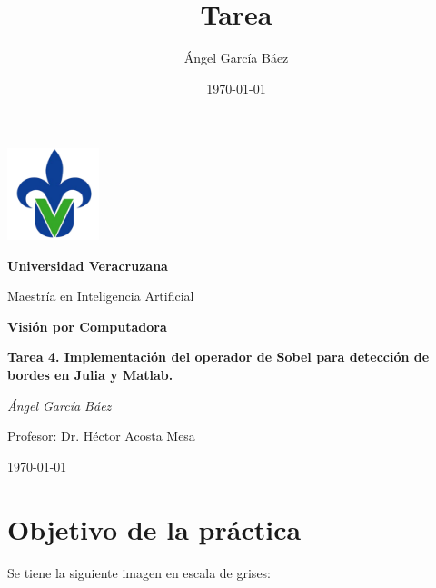 \documentclass[11pt, letterpaper]{article}
\title{\bfseries Tarea}
\author{Ángel García Báez}
\date{\today}
\begin{document}
	
	\begin{titlepage}
		\centering
		\includegraphics[width=0.2\textwidth]{logo.png}\par
		\vspace{1cm}
		{\LARGE \bfseries Universidad Veracruzana \par}
		\vspace{1cm}
		{\Large Maestría en Inteligencia Artificial\par}
		\vspace{3cm}
		{\LARGE \bfseries Visión por Computadora \par}
		\vspace{1cm}
		{\Large \bfseries Tarea 4. Implementación del operador de Sobel para detección de bordes en Julia y Matlab. \par}
		\vfill
		{\Large \textit{Ángel García Báez}\par}
		\vspace{1cm}
		{\Large Profesor: Dr. Héctor Acosta Mesa\par}
		\vfill
		{\Large \today \par}
	\end{titlepage}
	
	\newpage
	\tableofcontents
	\newpage
	
\section{Objetivo de la práctica}
	
Se tiene la siguiente imagen en escala de grises:
\end{document}
